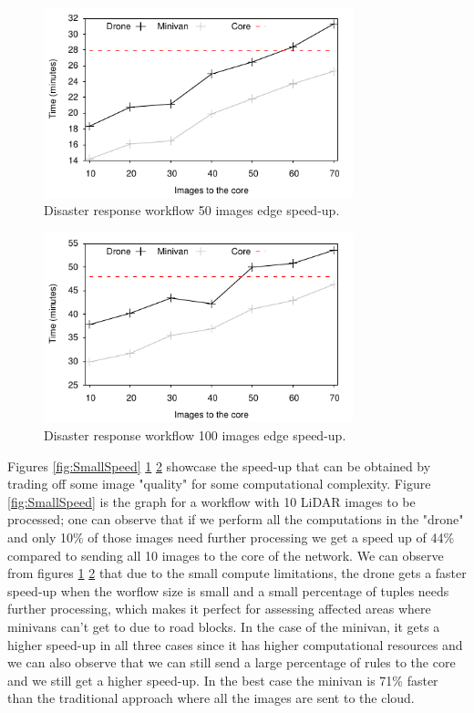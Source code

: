 \begin{figure}[h!]
  \centering
  \includegraphics[width=0.8\textwidth]{Results/MediumSpeed}
  \caption{Disaster response workflow 50 images edge speed-up.}
  \label{fig:MediumSpeed}
\end{figure}

\begin{figure}[h!]
  \centering
  \includegraphics[width=0.8\textwidth]{Results/BigSpeed}
  \caption{Disaster response workflow 100 images edge speed-up.}
  \label{fig:BigSpeed}
\end{figure}

Figures \ref{fig:SmallSpeed} \ref{fig:MediumSpeed} \ref{fig:BigSpeed} showcase the speed-up that can be obtained by trading off some image "quality" for some computational complexity. Figure \ref{fig:SmallSpeed} is the graph for a workflow with 10 LiDAR images to be processed; one can observe that if we perform all the computations in the "drone" and only 10\% of those images need further processing we get a speed up of 44\% compared to sending all 10 images to the core of the network. We can observe from figures \ref{fig:MediumSpeed} \ref{fig:BigSpeed} that due to the small compute limitations, the drone gets a faster speed-up when the worflow size is small and a small percentage of tuples needs further processing, which makes it perfect for assessing affected areas where minivans can't get to due to road blocks. In the case of the minivan, it gets a higher speed-up in all three cases since it has higher computational resources and we can also observe that we can still send a large percentage of rules to the core and we still get a higher speed-up. In the best case the minivan is 71\% faster than the traditional approach where all the images are sent to the cloud.


